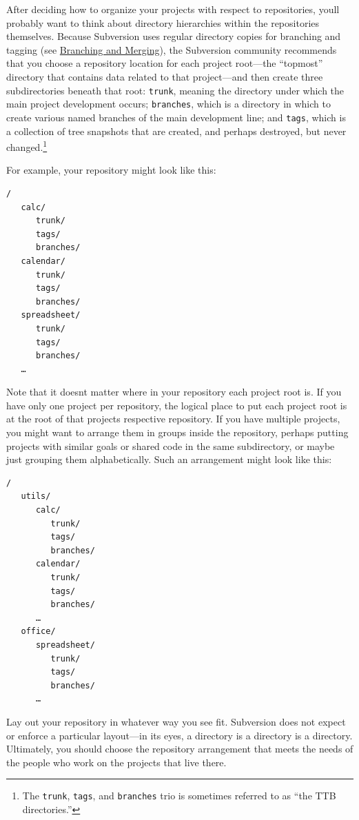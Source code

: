 After deciding how to organize your projects with respect to
repositories, you\textquotesingle ll probably want to think about
directory hierarchies within the repositories themselves. Because
Subversion uses regular directory copies for branching and tagging (see
\hyperref[svn.branchmerge]{Branching and Merging}), the Subversion
community recommends that you choose a repository location for each
project root---the ``topmost'' directory that contains data related to
that project---and then create three subdirectories beneath that root:
\texttt{trunk}, meaning the directory under which the main project
development occurs; \texttt{branches}, which is a directory in which to
create various named branches of the main development line; and
\texttt{tags}, which is a collection of tree snapshots that are created,
and perhaps destroyed, but never changed.\footnote{The \texttt{trunk},
  \texttt{tags}, and \texttt{branches} trio is sometimes referred to as
  ``the TTB directories.''}

For example, your repository might look like this:

\begin{verbatim}
/
   calc/
      trunk/
      tags/
      branches/
   calendar/
      trunk/
      tags/
      branches/
   spreadsheet/
      trunk/
      tags/
      branches/
   …
\end{verbatim}

Note that it doesn\textquotesingle t matter where in your repository
each project root is. If you have only one project per repository, the
logical place to put each project root is at the root of that
project\textquotesingle s respective repository. If you have multiple
projects, you might want to arrange them in groups inside the
repository, perhaps putting projects with similar goals or shared code
in the same subdirectory, or maybe just grouping them alphabetically.
Such an arrangement might look like this:

\begin{verbatim}
/
   utils/
      calc/
         trunk/
         tags/
         branches/
      calendar/
         trunk/
         tags/
         branches/
      …
   office/
      spreadsheet/
         trunk/
         tags/
         branches/
      …
\end{verbatim}

Lay out your repository in whatever way you see fit. Subversion does not
expect or enforce a particular layout---in its eyes, a directory is a
directory is a directory. Ultimately, you should choose the repository
arrangement that meets the needs of the people who work on the projects
that live there.

